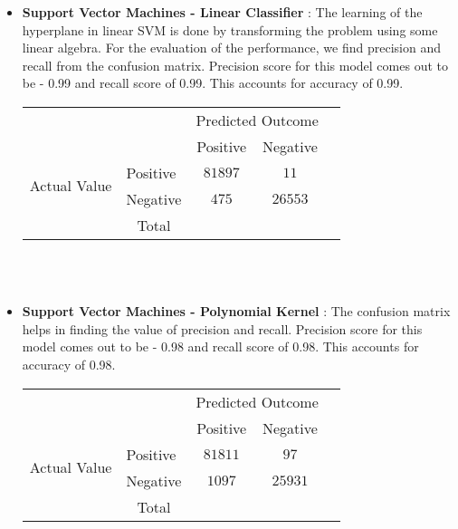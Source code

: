 \documentclass{article}
\begin{document}
\begin{itemize}
\item \textbf{Support Vector Machines - Linear Classifier} : The learning of the hyperplane in linear SVM is done by transforming the problem using some linear algebra. For the evaluation of the performance, we find precision and recall from the confusion matrix. Precision score for this model comes out to be - 0.99 and recall score of 0.99. This accounts for accuracy of 0.99. \\
\begin{center}
\begin{tabular}{l|l|c|c|c}
\multicolumn{2}{c}{}&\multicolumn{2}{c}{Predicted Outcome}&\\
\cline{3-4}
\multicolumn{2}{c|}{}&Positive&Negative&\multicolumn{1}{c}{}\\
\cline{2-4}
\multirow{2}{*}{Actual Value}& Positive & $81897$ & $11$\\
\cline{2-4}
& Negative & $475$ & $26553$\\
\cline{2-4}
\multicolumn{1}{c}{} & \multicolumn{1}{c}{Total} & \multicolumn{1}{c}{} & \multicolumn{    1}{c}{} & \multicolumn{1}{c}{}\\
\end{tabular} \\ \\
\end{center}
\newpage
\item \textbf{Support Vector Machines - Polynomial Kernel} : The confusion matrix helps in finding the value of precision and recall. Precision score for this model comes out to be - 0.98 and recall score of 0.98. This accounts for accuracy of 0.98. \\
\begin{center}
\begin{tabular}{l|l|c|c|c}
\multicolumn{2}{c}{}&\multicolumn{2}{c}{Predicted Outcome}&\\
\cline{3-4}
\multicolumn{2}{c|}{}&Positive&Negative&\multicolumn{1}{c}{}\\
\cline{2-4}
\multirow{2}{*}{Actual Value}& Positive & $81811$ & $97$\\
\cline{2-4}
& Negative & $1097$ & $25931$\\
\cline{2-4}
\multicolumn{1}{c}{} & \multicolumn{1}{c}{Total} & \multicolumn{1}{c}{} & \multicolumn{    1}{c}{} & \multicolumn{1}{c}{}\\
\end{tabular}
\end{center}
\\ \\


\end{itemize}
\end{document}
